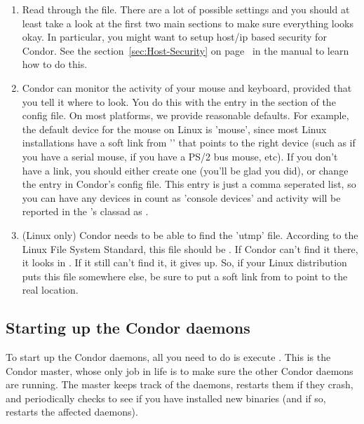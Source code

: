 \begin{enumerate}
\item Read through the  file.  There are a
    lot of possible settings and you should at least take a look at
    the first two main sections to make sure everything looks okay.
    In particular, you might want to setup host/ip based security for
    Condor.  See the section~\ref{sec:Host-Security} on
    page~\pageref{sec:Host-Security} in the manual to learn how to do
    this.

\item Condor can monitor the activity of your mouse and keyboard,
    provided that you tell it where to look.  You do this with the
     entry in the  section of
    the config file.  On most platforms, we provide reasonable
    defaults.  For example, the default device for the mouse on Linux
    is 'mouse', since most Linux installations have a soft link from
    '' that points to the right device (such as
     if you have a serial mouse,  if you have
    a PS/2 bus mouse, etc).  If you don't have a 
    link, you should either create one (you'll be glad you did), or
    change the  entry in Condor's config file.
    This entry is just a comma seperated list, so you can have any
    devices in  count as 'console devices' and activity
    will be reported in the 's classad as
    .

\item  (Linux only) Condor needs to be able to find the 'utmp' file.
    According to the Linux File System Standard, this file should be
    .  If Condor can't find it there, it looks in
    .  If it still can't find it, it gives up.  So, if
    your Linux distribution puts this file somewhere else, be sure to
    put a soft link from  to point to the real location.

\end{enumerate}

\subsection{Starting up the Condor daemons}

To start up the Condor daemons, all you need to do is execute
.  This is the Condor master, whose
only job in life is to make sure the other Condor daemons are running.
The master keeps track of the daemons, restarts them if they crash,
and periodically checks to see if you have installed new binaries (and
if so, restarts the affected daemons).

